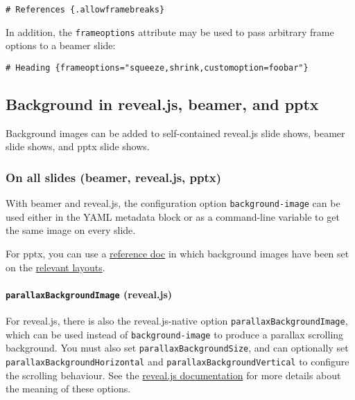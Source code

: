 \documentclass[
]{article}
\begin{document}
\begin{verbatim}
# References {.allowframebreaks}
\end{verbatim}

In addition, the \texttt{frameoptions} attribute may be used to pass
arbitrary frame options to a beamer slide:

\begin{verbatim}
# Heading {frameoptions="squeeze,shrink,customoption=foobar"}
\end{verbatim}

\subsection{Background in reveal.js, beamer, and
pptx}\label{background-in-reveal.js-beamer-and-pptx}

Background images can be added to self-contained reveal.js slide shows,
beamer slide shows, and pptx slide shows.

\subsubsection{On all slides (beamer, reveal.js,
pptx)}\label{on-all-slides-beamer-reveal.js-pptx}

With beamer and reveal.js, the configuration option
\texttt{background-image} can be used either in the YAML metadata block
or as a command-line variable to get the same image on every slide.

For pptx, you can use a \hyperref[option--reference-doc]{reference doc}
in which background images have been set on the
\hyperref[powerpoint-layout-choice]{relevant layouts}.

\paragraph{\texorpdfstring{\texttt{parallaxBackgroundImage}
(reveal.js)}{parallaxBackgroundImage (reveal.js)}}\label{parallaxbackgroundimage-reveal.js}

For reveal.js, there is also the reveal.js-native option
\texttt{parallaxBackgroundImage}, which can be used instead of
\texttt{background-image} to produce a parallax scrolling background.
You must also set \texttt{parallaxBackgroundSize}, and can optionally
set \texttt{parallaxBackgroundHorizontal} and
\texttt{parallaxBackgroundVertical} to configure the scrolling
behaviour. See the
\href{https://revealjs.com/backgrounds/\#parallax-background}{reveal.js
documentation} for more details about the meaning of these options.
\end{document}
